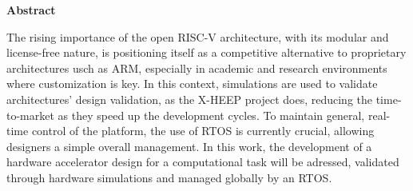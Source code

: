 \thispagestyle{empty}

\parindent=16mm

\vspace*{2cm}

\begin{flushleft}
  \begin{Large}
    \textbf{Abstract}\\
  \end{Large}
  \masterRule
\end{flushleft}

\vspace*{1cm}

The rising importance of the open RISC-V architecture, with its modular and license-free nature, is positioning itself as a competitive alternative to proprietary architectures usch as ARM, especially in academic and research environments where customization is key. In this context,  simulations are used to validate architectures' design validation, as the X-HEEP project does, reducing the time-to-market as they speed up the development cycles. To maintain general, real-time control of the platform, the use of RTOS is currently crucial, allowing designers a simple overall management. In this work, the development of a hardware accelerator design for a computational task will be adressed, validated through hardware simulations and managed globally by an RTOS.